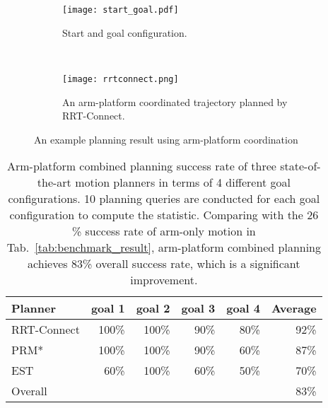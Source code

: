 \begin{figure}[!htbp]
\captionsetup[subfigure]{position=b}
    \centering
    \begin{subfigure}[t]{0.6\textwidth}
        \texttt{[image: start\_goal.pdf]}
        \caption{Start and goal configuration.}
        \label{fig:start_goal_states}
    \end{subfigure}
    ~ %
    \begin{subfigure}[t]{0.35\textwidth}
        \texttt{[image: rrtconnect.png]}
        \caption{An arm-platform coordinated trajectory planned by RRT-Connect.}
        \label{fig:RRTtrajectory}
    \end{subfigure}
    \caption{An example planning result  using arm-platform coordination}\label{fig:example_traj}
\end{figure} 

 
\begin{table}[!htbp]
\centering
\begin{tabular}{lrrrr|r}
Planner     & goal 1 & goal 2 & goal 3 & goal 4 & Average \\ 
\hline
\hline
RRT-Connect & 100\%   & 100\%  & 90\%   & 80\%   & 92\%    \\
PRM*        & 100\%   & 100\%   & 90\%    & 60\%   & 87\%    \\
EST         & 60\%   & 100\%   & 60\%    & 50\%    & 70\%    \\ \hline
Overall     &        &        &        &        & 83\%   
\end{tabular}
\caption{Arm-platform combined planning success rate of three state-of-the-art motion planners in terms of 4 different goal configurations. 10 planning queries are conducted for each goal configuration to compute the statistic. Comparing with the 26 \% success rate of arm-only motion in Tab.~\ref{tab:benchmark_result}, arm-platform combined planning achieves 83\% overall success rate, which is a significant improvement.} 
\label{tab:benchmark_result_new}
\end{table}

